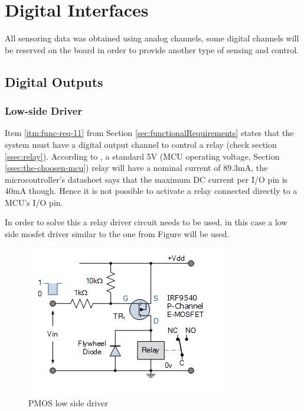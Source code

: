 \section{Digital Interfaces}\label{sec:digital-interfaces}

	All sensoring data was obtained using analog channels, some digital channels will be reserved on the board in order to provide another type of sensing and control.

	\subsection{Digital Outputs}\label{ssec:digital-outputs}

		\subsubsection{Low-side Driver}\label{sssec:digital-outputs-low-side-driver}

			Item \ref{itm:func-req-11} from Section \ref{sec:functionalRequirements} states that the system must have a digital output channel to control a relay (check section \ref{ssec:relay}). According to \cite{songle-relay-datasheet}, a standard 5V (MCU operating voltage, Section \ref{ssec:the-choosen-mcu}) relay will have a nominal current of 89.3mA, the microcontroller's datasheet \cite{atmega328p-datasheet} says that the maximum DC current per I/O pin is 40mA though. Hence it is not possible to activate a relay connected directly to a MCU's I/O pin.
			\par 
			In order to solve this a relay driver circuit needs to be used, in this case a low side mosfet driver similar to the one from Figure \cite{pmos-low-side-driver} will be used.

			\begin{figure}[htbp]
				\centering
				\includegraphics[scale=0.7]{figuras/fig-pmos-low-side-driver.png}
				\caption{PMOS low side driver \cite{pmos-low-side-driver}}
				\label{fig:pmos-low-side-driver}
			\end{figure}

